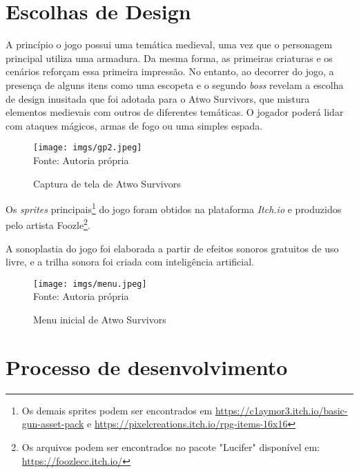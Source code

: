 \documentclass[a4paper,12pt]{article}
\begin{document}
\section{Escolhas de Design}

A princípio o jogo possui uma temática medieval, uma vez que o personagem principal utiliza uma armadura. Da mesma forma, as primeiras criaturas e os cenários reforçam essa primeira impressão. No entanto, ao decorrer do jogo, a presença de alguns itens como uma escopeta e o segundo \textit{boss} revelam a escolha de design inusitada que foi adotada para o Atwo Survivors, que mistura elementos medievais com outros de diferentes temáticas. O jogador poderá lidar com ataques mágicos, armas de fogo ou uma simples espada.

\begin{figure}[h!]
    \centering
    \caption{Captura de tela de Atwo Survivors}
    \texttt{[image: imgs/gp2.jpeg]}\\
    {Fonte: Autoria própria}
\end{figure}

Os \textit{sprites} principais\footnote{Os demais sprites podem ser encontrados em \href{https://c1aymor3.itch.io/basic-gun-asset-pack}{https://c1aymor3.itch.io/basic-gun-asset-pack} e \href{https://pixelcreations.itch.io/rpg-items-16x16}{https://pixelcreations.itch.io/rpg-items-16x16}} do jogo foram obtidos na plataforma \textit{Itch.io} e produzidos pelo artista Foozle\footnote{Os arquivos podem ser encontrados no pacote "Lucifer" \space disponível em: \href{https://foozlecc.itch.io/}{https://foozlecc.itch.io/}}. 

A sonoplastia do jogo foi elaborada a partir de efeitos sonoros gratuitos de uso livre, e a trilha sonora foi criada com inteligência artificial. 

\begin{figure}[h!]
    \centering
    \caption{Menu inicial de Atwo Survivors}
    \texttt{[image: imgs/menu.jpeg]}\\
    {Fonte: Autoria própria}
\end{figure}

\newpage



\section{Processo de desenvolvimento}
\end{document}
